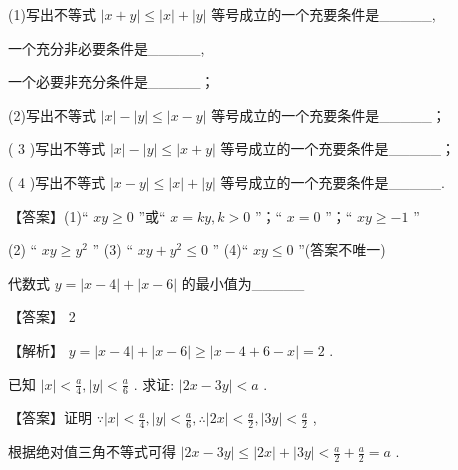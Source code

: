 \documentclass[11pt,a4paper]{article}
\begin{document}
\begin{problem} 
(1)写出不等式 \(\displaystyle \left| {x + y}\right|  \leq  \left| x\right|  + \left| y\right|\) 等号成立的一个充要条件是\_\_\_\_\_,

一个充分非必要条件是\_\_\_\_\_,

一个必要非充分条件是\_\_\_\_\_；

(2)写出不等式 \(\displaystyle \left| x\right|  - \left| y\right|  \leq  \left| {x - y}\right|\) 等号成立的一个充要条件是\_\_\_\_\_；

( 3 )写出不等式 \(\displaystyle \left| x\right|  - \left| y\right|  \leq  \left| {x + y}\right|\) 等号成立的一个充要条件是\_\_\_\_\_；

( 4 )写出不等式 \(\displaystyle \left| {x - y}\right|  \leq  \left| x\right|  + \left| y\right|\) 等号成立的一个充要条件是\_\_\_\_\_.
\begin{jiexi}
【答案】(1)“ \(\displaystyle {xy} \geq  0\) ”或“ \(\displaystyle x = {ky},k > 0\) ”；“ \(\displaystyle x = 0\) ”；“ \(\displaystyle {xy} \geq   - 1\) ”

(2) “ \(\displaystyle {xy} \geq  {y}^{2}\) ” (3) “ \(\displaystyle {xy} + {y}^{2} \leq  0\) ” (4)“ \(\displaystyle {xy} \leq  0\) ”(答案不唯一)

\end{jiexi}
\end{problem}
\begin{problem} 
代数式 \(\displaystyle y = \left| {x - 4}\right|  + \left| {x - 6}\right|\) 的最小值为\_\_\_\_\_
\begin{jiexi}
【答案】 2

【解析】 \(\displaystyle y = \left| {x - 4}\right|  + \left| {x - 6}\right|  \geq  \left| {x - 4 + 6 - x}\right|  = 2\) .

\end{jiexi}
\end{problem}
\begin{problem} 
已知 \(\displaystyle \left| x\right|  < \frac{a}{4},\left| y\right|  < \frac{a}{6}\) . 求证: \(\displaystyle \left| {{2x} - {3y}}\right|  < a\) .
\begin{jiexi}[35]
【答案】证明 \(\displaystyle \because \left| x\right|  < \frac{a}{4},\left| y\right|  < \frac{a}{6},\therefore \left| {2x}\right|  < \frac{a}{2},\left| {3y}\right|  < \frac{a}{2}\) ,

根据绝对值三角不等式可得 \(\displaystyle \left| {{2x} - {3y}}\right|  \leq  \left| {2x}\right|  + \left| {3y}\right|  < \frac{a}{2} + \frac{a}{2} = a\) .


\end{jiexi}
\end{problem}
\end{document}

